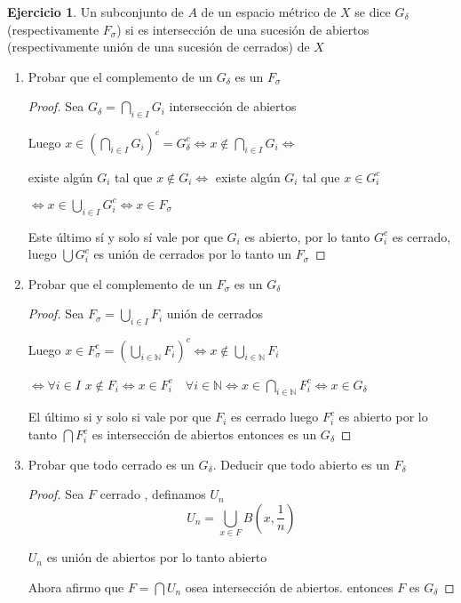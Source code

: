 \documentclass[12pt]{report}
\newcommand{\N}{\mathbb{N}}
\theoremstyle{definition}
\newtheorem{ej}{Ejercicio}
\begin{document}
\begin{ej}
Un subconjunto de $A$ de un espacio métrico de $X$ se dice $G_{\delta}$ (respectivamente $F_\sigma$) si es intersección de una sucesión de abiertos (respectivamente unión de una sucesión de cerrados) de $X$
\begin{enumerate}
  \item Probar que el complemento de un $ G_{\delta}$ es un $F_{\sigma}$
    \begin{proof}
    Sea $G_{\delta} = \bigcap_{i \in I} G_i$ intersección de abiertos

    Luego $x \in (\bigcap_{i \in I} G_i)^c = G_{\delta}^c \iff x \notin \bigcap_{i \in I}G_i \iff$

    existe algún $G_i$ tal que $x \notin G_i \iff$ existe algún $G_i$ tal que $ x \in G_{i}^c$

    $\iff x \in \bigcup_{i \in I} G_i^c \iff x \in F_{\sigma}$
 
    Este último sí y solo sí vale por que $G_i$ es abierto, por lo tanto $G_{i}^c$ es cerrado, luego $\bigcup G_i^c$ es unión de cerrados por lo tanto un $F_{\sigma}$
    \end{proof}
  \item Probar que el complemento de un $F_{\sigma}$ es un $G_{\delta}$
    \begin{proof}
      Sea $F_{\sigma} = \bigcup_{i \in I}F_i$ unión de cerrados 
      
      Luego $x \in F_{\sigma}^c = (\bigcup_{i \in \N} F_i)^c \iff x \notin \bigcup_{i \in \N} F_i$ 

      $\iff \forall i \in I$ $x \notin F_i \iff x \in F_i^c \quad \forall i \in \N \iff x \in \bigcap_{i \in \N} F_i^c \iff x \in G_{\delta}$  

      El último si y solo si vale por que  $F_i$ es cerrado luego $F_i^c$ es abierto por lo tanto $\bigcap F_{i}^c$ es intersección de abiertos entonces es un $G_{\delta}$

    \end{proof}
  \item Probar que todo cerrado es un $G_{\delta}$. Deducir que todo abierto es un $F_{\delta}$
\begin{proof}

  Sea $F$ cerrado , definamos $U_n$ $$U_n = \bigcup_{x \in F} B(x,\frac{1}{n})$$

  $U_n$ es unión de abiertos por lo tanto abierto

  Ahora afirmo que $F = \bigcap U_n$ osea intersección de abiertos. entonces $F$ es $G_{\delta}$


\end{proof}
\end{enumerate}
\end{ej}
\end{document}
